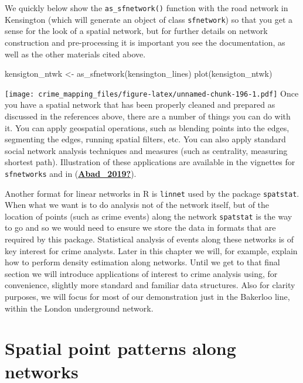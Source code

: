 \documentclass[
  krantz2]{krantz}
\makeatletter
\newenvironment{Shaded}{\begin{snugshade}}{\end{snugshade}}
\newcommand{\FunctionTok}[1]{\textcolor[rgb]{0,0,0}{#1}}
\newcommand{\NormalTok}[1]{#1}
\newcommand{\OtherTok}[1]{\textcolor[rgb]{0.37,0.37,0.37}{#1}}
\newenvironment{kframe}{%
\medskip{}
\setlength{\fboxsep}{.8em}
 \def\at@end@of@kframe{}%
 \ifinner\ifhmode%
  \def\at@end@of@kframe{\end{minipage}}%
  \begin{minipage}{\columnwidth}%
 \fi\fi%
 \def\FrameCommand##1{\hskip\@totalleftmargin \hskip-\fboxsep
 \colorbox{shadecolor}{##1}\hskip-\fboxsep
     \hskip-\linewidth \hskip-\@totalleftmargin \hskip\columnwidth}%
 \MakeFramed {\advance\hsize-\width
   \@totalleftmargin\z@ \linewidth\hsize
   \@setminipage}}%
 {\par\unskip\endMakeFramed%
 \at@end@of@kframe}
\renewenvironment{Shaded}{\begin{kframe}}{\end{kframe}}
\makeatother
\begin{document}
We quickly below show the \texttt{as\_sfnetwork()} function with the road network in Kensington (which will generate an object of class \texttt{sfnetwork}) so that you get a sense for the look of a spatial network, but for further details on network construction and pre-processing it is important you see the documentation, as well as the other materials cited above.

\begin{Shaded}
\begin{Highlighting}[]
\NormalTok{kensigton\_ntwk }\OtherTok{\textless{}{-}} \FunctionTok{as\_sfnetwork}\NormalTok{(kensington\_lines)}
\FunctionTok{plot}\NormalTok{(kensigton\_ntwk)}
\end{Highlighting}
\end{Shaded}

\texttt{[image: crime\_mapping\_files/figure-latex/unnamed-chunk-196-1.pdf]}
Once you have a spatial network that has been properly cleaned and prepared as discussed in the references above, there are a number of things you can do with it. You can apply geospatial operations, such as blending points into the edges, segmenting the edges, running spatial filters, etc. You can also apply standard social network analysis techniques and measures (such as centrality, measuring shortest path). Illustration of these applications are available in the vignettes for \texttt{sfnetworks} and in (\protect\hyperlink{ref-Abad_2019}{\textbf{Abad\_2019?}}).

Another format for linear networks in R is \texttt{linnet} used by the package \texttt{spatstat}. When what we want is to do analysis not of the network itself, but of the location of points (such as crime events) along the network \texttt{spatstat} is the way to go and so we would need to ensure we store the data in formats that are required by this package. Statistical analysis of events along these networks is of key interest for crime analysts. Later in this chapter we will, for example, explain how to perform density estimation along networks. Until we get to that final section we will introduce applications of interest to crime analysis using, for convenience, slightly more standard and familiar data structures. Also for clarity purposes, we will focus for most of our demonstration just in the Bakerloo line, within the London underground network.

\hypertarget{spatial-point-patterns-along-networks}{%
\section{Spatial point patterns along networks}\label{spatial-point-patterns-along-networks}}
\end{document}

